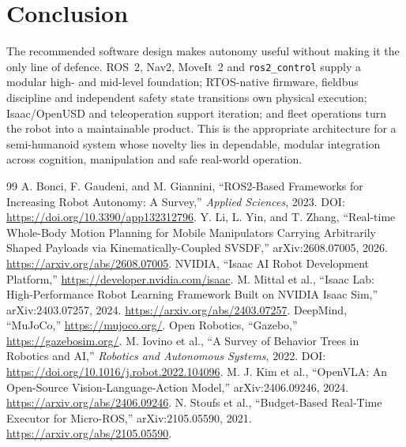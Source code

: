 \documentclass[10pt,a4paper]{article}
\begin{document}
\section{Conclusion}
The recommended software design makes autonomy useful without making it the only line of defence. ROS~2, Nav2, MoveIt~2 and \texttt{ros2\_control} supply a modular high- and mid-level foundation; RTOS-native firmware, fieldbus discipline and independent safety state transitions own physical execution; Isaac/OpenUSD and teleoperation support iteration; and fleet operations turn the robot into a maintainable product. This is the appropriate architecture for a semi-humanoid system whose novelty lies in dependable, modular integration across cognition, manipulation and safe real-world operation.

\begin{thebibliography}{99}\small
{} A. Bonci, F. Gaudeni, and M. Giannini, ``ROS2-Based Frameworks for Increasing Robot Autonomy: A Survey,'' \emph{Applied Sciences}, 2023. DOI: \url{https://doi.org/10.3390/app132312796}.
 Y. Li, L. Yin, and T. Zhang, ``Real-time Whole-Body Motion Planning for Mobile Manipulators Carrying Arbitrarily Shaped Payloads via Kinematically-Coupled SVSDF,'' arXiv:2608.07005, 2026. \url{https://arxiv.org/abs/2608.07005}.
 NVIDIA, ``Isaac AI Robot Development Platform,'' \url{https://developer.nvidia.com/isaac}.
 M. Mittal et al., ``Isaac Lab: High-Performance Robot Learning Framework Built on NVIDIA Isaac Sim,'' arXiv:2403.07257, 2024. \url{https://arxiv.org/abs/2403.07257}.
 DeepMind, ``MuJoCo,'' \url{https://mujoco.org/}.
 Open Robotics, ``Gazebo,'' \url{https://gazebosim.org/}.
 M. Iovino et al., ``A Survey of Behavior Trees in Robotics and AI,'' \emph{Robotics and Autonomous Systems}, 2022. DOI: \url{https://doi.org/10.1016/j.robot.2022.104096}.
 M. J. Kim et al., ``OpenVLA: An Open-Source Vision-Language-Action Model,'' arXiv:2406.09246, 2024. \url{https://arxiv.org/abs/2406.09246}.
 N. Stoufs et al., ``Budget-Based Real-Time Executor for Micro-ROS,'' arXiv:2105.05590, 2021. \url{https://arxiv.org/abs/2105.05590}.
\end{thebibliography}
\end{document}
